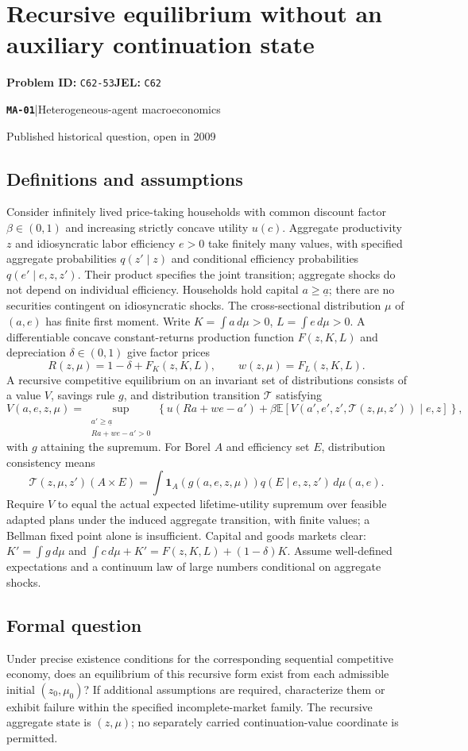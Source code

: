 \documentclass[11pt,a4paper]{article}
\newcommand{\E}{\mathbb E}
\newcommand{\ind}{\mathbf 1}
\newcommand{\entrymeta}[3]{{\sffamily\small\color{muted}\textbf{\texttt{#1}}\quad|\quad #2\par #3\par}}
\begin{document}
\section*{Recursive equilibrium without an auxiliary continuation state}
\textbf{Problem ID:} \texttt{C62-53}\quad \textbf{JEL:} \texttt{C62}\par
\label{problem:OP-0582}
\label{beyond:MA-01}
\entrymeta{MA-01}{Heterogeneous-agent macroeconomics}{Published historical question, open in 2009}
\subsection*{Definitions and assumptions}
Consider infinitely lived price-taking households with common discount factor $\beta\in(0,1)$ and increasing strictly concave utility $u(c)$. Aggregate productivity $z$ and idiosyncratic labor efficiency $e>0$ take finitely many values, with specified aggregate probabilities $q(z'\mid z)$ and conditional efficiency probabilities $q(e'\mid e,z,z')$. Their product specifies the joint transition; aggregate shocks do not depend on individual efficiency. Households hold capital $a\ge\underline a$; there are no securities contingent on idiosyncratic shocks. The cross-sectional distribution $\mu$ of $(a,e)$ has finite first moment. Write $K=\int a\,d\mu>0$, $L=\int e\,d\mu>0$. A differentiable concave constant-returns production function $F(z,K,L)$ and depreciation $\delta\in(0,1)$ give factor prices
\[
 R(z,\mu)=1-\delta+F_K(z,K,L),\qquad w(z,\mu)=F_L(z,K,L).
\]
A recursive competitive equilibrium on an invariant set of distributions consists of a value $V$, savings rule $g$, and distribution transition $\mathcal T$ satisfying
\[
 V(a,e,z,\mu)=\sup_{\substack{a'\ge\underline a\\Ra+we-a'>0}}\left\{u(Ra+we-a')+
 \beta\E[V(a',e',z',\mathcal T(z,\mu,z'))\mid e,z]\right\},
\]
with $g$ attaining the supremum. For Borel $A$ and efficiency set $E$, distribution consistency means
\[
 \mathcal T(z,\mu,z')(A\times E)=\int \ind_{A}(g(a,e,z,\mu))q(E\mid e,z,z')\,d\mu(a,e).
\]
Require $V$ to equal the actual expected lifetime-utility supremum over feasible adapted plans under the induced aggregate transition, with finite values; a Bellman fixed point alone is insufficient. Capital and goods markets clear: $K'=\int g\,d\mu$ and $\int c\,d\mu+K'=F(z,K,L)+(1-\delta)K$. Assume well-defined expectations and a continuum law of large numbers conditional on aggregate shocks.
\subsection*{Formal question}
Under precise existence conditions for the corresponding sequential competitive economy, does an equilibrium of this recursive form exist from each admissible initial $(z_0,\mu_0)$? If additional assumptions are required, characterize them or exhibit failure within the specified incomplete-market family. The recursive aggregate state is $(z,\mu)$; no separately carried continuation-value coordinate is permitted.
\end{document}

